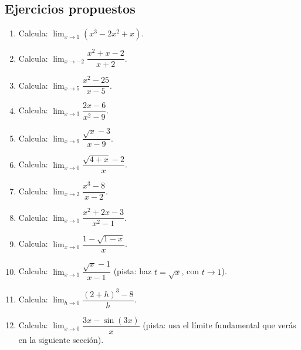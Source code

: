 \documentclass[12pt, letterpaper]{article}
\begin{document}
\newpage

\subsection{Ejercicios propuestos}

\begin{enumerate}[resume=ejercicios, leftmargin=*]
  \item \facil{} Calcula: $\lim_{x \to 1} (x^3 - 2x^2 + x)$.

  \item \facil{} Calcula: $\lim_{x \to -2} \dfrac{x^2 + x - 2}{x + 2}$.

  \item \facil{} Calcula: $\lim_{x \to 5} \dfrac{x^2 - 25}{x - 5}$.

  \item \facil{} Calcula: $\lim_{x \to 3} \dfrac{2x - 6}{x^2 - 9}$.

  \item \medio{} Calcula: $\lim_{x \to 9} \dfrac{\sqrt{x} - 3}{x - 9}$.

  \item \medio{} Calcula: $\lim_{x \to 0} \dfrac{\sqrt{4 + x} - 2}{x}$.

  \item \medio{} Calcula: $\lim_{x \to 2} \dfrac{x^3 - 8}{x - 2}$.

  \item \medio{} Calcula: $\lim_{x \to 1} \dfrac{x^2 + 2x - 3}{x^2 - 1}$.

  \item \dificil{} Calcula: $\lim_{x \to 0} \dfrac{1 - \sqrt{1 - x}}{x}$.

  \item \dificil{} Calcula: $\lim_{x \to 1} \dfrac{\sqrt{x} - 1}{x - 1}$ (pista: haz $t = \sqrt{x}$, con $t \to 1$).

  \item \dificil{} Calcula: $\lim_{h \to 0} \dfrac{(2 + h)^3 - 8}{h}$.

  \item \dificil{} Calcula: $\lim_{x \to 0} \dfrac{3x - \sin(3x)}{x}$ (pista: usa el límite fundamental que verás en la siguiente sección).
\end{enumerate}

\newpage


\end{document}
